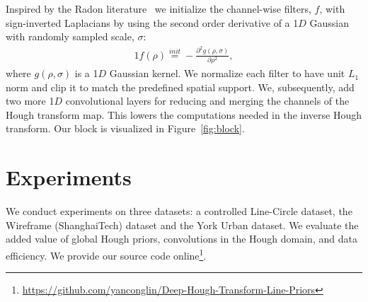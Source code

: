 \documentclass[runningheads]{llncs}
\begin{document}
Inspired by the Radon literature~\cite{magnusson1993linogram,nikolaev2008hough,wei2019x} we initialize the channel-wise filters, $f$, with sign-inverted Laplacians by using the second order derivative of a 1$D$ Gaussian with randomly sampled scale, $\sigma$:  
\begin{alignat}{1}
    f(\rho) \overset{init}{=} - \frac{\partial^2 g(\rho,\sigma)}{\partial \rho^2}, 
\end{alignat}
where $g(\rho, \sigma)$ is a 1$D$ Gaussian kernel. 
We normalize each filter to have unit $L_1$ norm and clip it to match the predefined spatial support. 
We, subsequently, add two more 1$D$ convolutional layers for reducing and merging the channels of the Hough transform map.
This lowers the computations needed in the inverse Hough transform. Our block is visualized in Figure~\ref{fig:block}.















 \section{Experiments}
We conduct experiments on three datasets: a controlled Line-Circle dataset, the Wireframe (ShanghaiTech) \cite{huang2018learning} dataset and the York Urban \cite{denis2008efficient} dataset. We evaluate the added value of global Hough priors, convolutions in the Hough domain, and data efficiency.
We provide our source code online\footnote{\url{https://github.com/yanconglin/Deep-Hough-Transform-Line-Priors}}.
\end{document}
